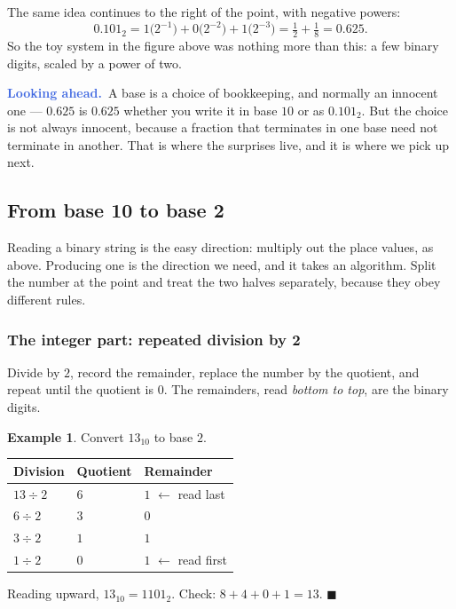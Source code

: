 \documentclass[11pt]{article}
\theoremstyle{plain}
\theoremstyle{definition}
\newtheorem{ex}{Example}[section]
\theoremstyle{remark}
\newcommand{\lookahead}{\par\smallskip\noindent
  \textbf{\sffamily\textcolor{RoyalBlue}{Looking ahead.}}\ \ignorespaces}
\begin{document}
\noindent The same idea continues to the right of the point, with negative
powers:
\[
  0.101_{2}
  = 1\bigl(2^{-1}\bigr) + 0\bigl(2^{-2}\bigr) + 1\bigl(2^{-3}\bigr)
  = \tfrac12 + \tfrac18
  = 0.625 .
\]
So the toy system in the figure above was nothing more than this: a few binary
digits, scaled by a power of two.

\lookahead A base is a choice of bookkeeping, and normally an innocent one ---
$0.625$ is $0.625$ whether you write it in base $10$ or as $0.101_{2}$. But the
choice is not always innocent, because a fraction that terminates in one base
need not terminate in another. That is where the surprises live, and it is where
we pick up next.

\subsection{From base 10 to base 2}
Reading a binary string is the easy direction: multiply out the place values, as
above. Producing one is the direction we need, and it takes an algorithm. Split
the number at the point and treat the two halves separately, because they obey
different rules.

\subsubsection*{The integer part: repeated division by 2}
Divide by $2$, record the remainder, replace the number by the quotient, and
repeat until the quotient is $0$. The remainders, read \emph{bottom to top}, are
the binary digits.

\begin{ex}
Convert $13_{10}$ to base $2$.

\begin{center}
\renewcommand{\arraystretch}{1.15}
\begin{tabular}{@{}l l l@{}}
\toprule
\textbf{Division} & \textbf{Quotient} & \textbf{Remainder} \\
\midrule
$13 \div 2$ & $6$ & $1$ \quad$\leftarrow$ read last \\
$6  \div 2$ & $3$ & $0$ \\
$3  \div 2$ & $1$ & $1$ \\
$1  \div 2$ & $0$ & $1$ \quad$\leftarrow$ read first \\
\bottomrule
\end{tabular}
\end{center}

\noindent Reading upward, $13_{10}=1101_{2}$. Check: $8+4+0+1=13$.
\hfill$\blacksquare$
\end{ex}
\end{document}
